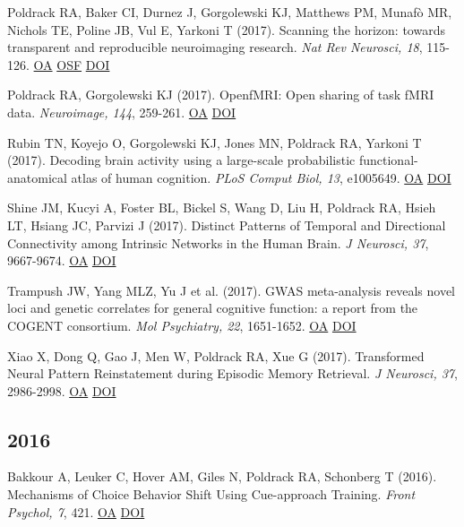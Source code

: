 \documentclass[10pt, letterpaper]{article}
\begin{document}
Poldrack RA, Baker CI, Durnez J, Gorgolewski KJ, Matthews PM, Munafò MR, Nichols TE, Poline JB, Vul E, Yarkoni T (2017). Scanning the horizon: towards transparent and reproducible neuroimaging research. \textit{Nat Rev Neurosci, 18}, 115-126. \href{https://www.ncbi.nlm.nih.gov/pmc/articles/PMC6910649}{OA} \href{https://osf.io/spr9a/}{OSF} \href{http://dx.doi.org/10.1038/nrn.2016.167}{DOI} \vspace{2mm}

Poldrack RA, Gorgolewski KJ (2017). OpenfMRI: Open sharing of task fMRI data. \textit{Neuroimage, 144}, 259-261. \href{https://www.ncbi.nlm.nih.gov/pmc/articles/PMC4669234}{OA} \href{http://dx.doi.org/10.1016/j.neuroimage.2015.05.073}{DOI} \vspace{2mm}

Rubin TN, Koyejo O, Gorgolewski KJ, Jones MN, Poldrack RA, Yarkoni T (2017). Decoding brain activity using a large-scale probabilistic functional-anatomical atlas of human cognition. \textit{PLoS Comput Biol, 13}, e1005649. \href{https://www.ncbi.nlm.nih.gov/pmc/articles/PMC5683652}{OA} \href{http://dx.doi.org/10.1371/journal.pcbi.1005649}{DOI} \vspace{2mm}

Shine JM, Kucyi A, Foster BL, Bickel S, Wang D, Liu H, Poldrack RA, Hsieh LT, Hsiang JC, Parvizi J (2017). Distinct Patterns of Temporal and Directional Connectivity among Intrinsic Networks in the Human Brain. \textit{J Neurosci, 37}, 9667-9674. \href{https://www.ncbi.nlm.nih.gov/pmc/articles/PMC6596608}{OA} \href{http://dx.doi.org/10.1523/jneurosci.1574-17.2017}{DOI} \vspace{2mm}

Trampush JW, Yang MLZ, Yu J et al. (2017). GWAS meta-analysis reveals novel loci and genetic correlates for general cognitive function: a report from the COGENT consortium. \textit{Mol Psychiatry, 22}, 1651-1652. \href{https://www.ncbi.nlm.nih.gov/pmc/articles/PMC5659072}{OA} \href{http://dx.doi.org/10.1038/mp.2017.197}{DOI} \vspace{2mm}

Xiao X, Dong Q, Gao J, Men W, Poldrack RA, Xue G (2017). Transformed Neural Pattern Reinstatement during Episodic Memory Retrieval. \textit{J Neurosci, 37}, 2986-2998. \href{https://www.ncbi.nlm.nih.gov/pmc/articles/PMC6596730}{OA} \href{http://dx.doi.org/10.1523/jneurosci.2324-16.2017}{DOI} \vspace{2mm}

\subsection*{2016}Bakkour A, Leuker C, Hover AM, Giles N, Poldrack RA, Schonberg T (2016). Mechanisms of Choice Behavior Shift Using Cue-approach Training. \textit{Front Psychol, 7}, 421. \href{https://www.ncbi.nlm.nih.gov/pmc/articles/PMC4804288}{OA} \href{http://dx.doi.org/10.3389/fpsyg.2016.00421}{DOI} \vspace{2mm}
\end{document}
